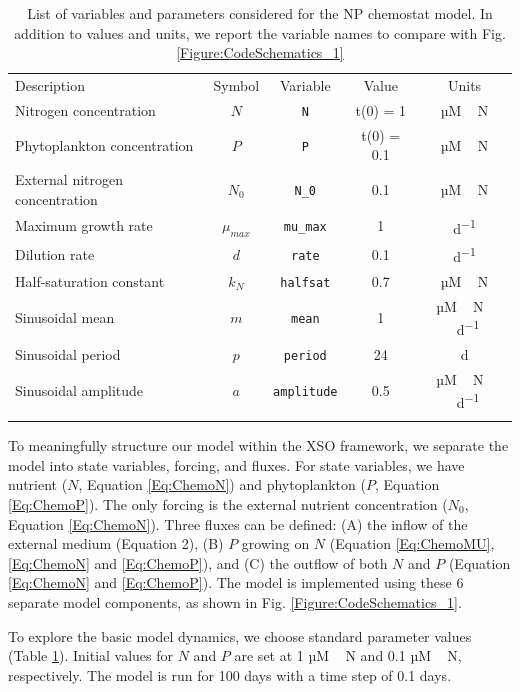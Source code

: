 \documentclass[gmd, manuscript]{copernicus}
\begin{document}
%
\begin{table}[t]
\caption{List of variables and parameters considered for the NP chemostat model. In addition to values and units, we report the variable names to compare with Fig. \ref{Figure:CodeSchematics_1}}
\begin{tabular}{l c c c c}
\tophline
Description & Symbol & Variable & Value & Units \\
\middlehline

Nitrogen concentration & $N$ & \texttt{N} & t(0) = 1 & \unit{µM\,N} \\
Phytoplankton concentration & $P$ & \texttt{P} & t(0) = 0.1 & \unit{µM\,N} \\
External nitrogen concentration & $N_0$ & \texttt{N\_0} & 0.1 & \unit{µM\,N} \\
Maximum growth rate & $\mu_{max}$ & \texttt{mu\_max} & 1 & \unit{d^{-1}} \\
Dilution rate & $d$ & \texttt{rate} & 0.1 & \unit{d^{-1}}\\
Half-saturation constant &  $k_N$ & \texttt{halfsat} & 0.7 & \unit{µM\,N}\\

Sinusoidal mean &  $m$ & \texttt{mean} & 1 & \unit{µM\,N\,d^{-1}}\\
Sinusoidal period &  $p$ & \texttt{period} & 24 & \unit{d}\\
Sinusoidal amplitude &  $a$ & \texttt{amplitude} & 0.5 & \unit{µM\,N\,d^{-1}}\\

\bottomhline
\end{tabular}
\label{Table:UseCase1Parameters}
\end{table}
%
To meaningfully structure our model within the XSO framework, we separate the model into state variables, forcing, and fluxes. For state variables, we have nutrient ($N$, Equation \ref{Eq:ChemoN}) and phytoplankton ($P$, Equation \ref{Eq:ChemoP}). The only forcing is the external nutrient concentration ($N_0$, Equation \ref{Eq:ChemoN}). Three fluxes can be defined: (A) the inflow of the external medium (Equation 2), (B) $P$ growing on $N$ (Equation \ref{Eq:ChemoMU}, \ref{Eq:ChemoN} and \ref{Eq:ChemoP}), and (C) the outflow of both $N$ and $P$ (Equation \ref{Eq:ChemoN} and \ref{Eq:ChemoP}). The model is implemented using these 6 separate model components, as shown in Fig. \ref{Figure:CodeSchematics_1}.

To explore the basic model dynamics, we choose standard parameter values (Table \ref{Table:UseCase1Parameters}). Initial values for $N$ and $P$ are set at 1 \unit{µM\,N} and 0.1 \unit{µM\,N}, respectively. The model is run for 100 days with a time step of 0.1 days.
\end{document}
